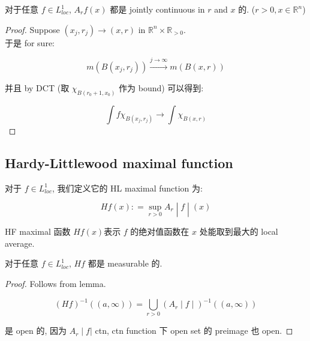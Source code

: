 \begin{lemma}

对于任意 \(f \in L_{loc}^{1}\), \(A_{r}f(x)\) 都是 jointly continuous in \(r\) and \(x\) 的. (\(r > 0,x \in \mathbb{R}^{n}\))

\end{lemma}

\begin{proof}

Suppose \((x_{j},r_{j})\rightarrow(x,r)\) in \(\mathbb{R}^{n} \times \mathbb{R}_{> 0}\).\\
于是 for sure:

\[m(B(x_{j},r_{j}))\overset{j\rightarrow\infty}{\rightarrow}m(B(x,r))\]

并且 by DCT (取 \(\chi_{B(r_{0} + 1,x_{0})}\) 作为 bound) 可以得到:

\[\int f\chi_{B(x_{j},r_{j})}\rightarrow\int\chi_{B(x,r)}\]

\end{proof}

\subsection{Hardy-Littlewood maximal function}\label{hardy-littlewood-maximal-function}

\begin{definition}{}

对于 \(f \in L_{loc}^{1}\), 我们定义它的 HL maximal function 为:

\[\left. Hf(x): = \sup\limits_{r > 0}A_{r} \middle| f \middle| (x) \right.\]

\end{definition}

HF maximal 函数 \(Hf(x)\)表示 \(f\) 的绝对值函数在 \(x\) 处能取到最大的 local average.

\begin{theorem}{}

对于任意 \(f \in L_{loc}^{1}\), \(Hf\) 都是 measurable 的.

\end{theorem}

\begin{proof}

Follows from lemma.

\[\left. (Hf)^{- 1}((a,\infty)) = \bigcup\limits_{r > 0}(A_{r} \middle| f \middle| )^{- 1}((a,\infty)) \right.\]

是 open 的, 因为 \(\left. A_{r} \middle| f| \right.\) ctn, ctn function 下 open set 的 preimage 也 open.

\end{proof}

